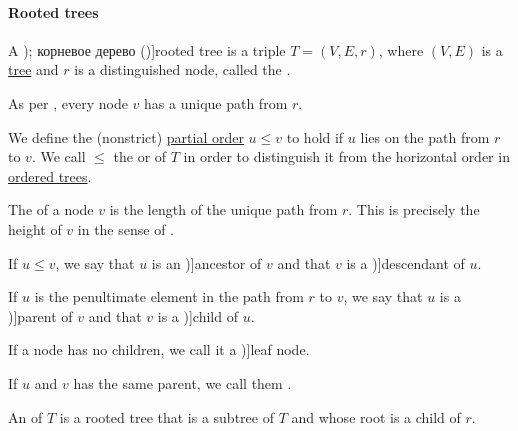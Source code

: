 \paragraph{Rooted trees}

\begin{definition}\label{def:rooted_tree}
  A \term[ru=ориентированное дерево (\cite[323]{Емеличев1990}); корневое дерево (\cite[.1]{Новиков2013})]{rooted tree} is a triple \( T = (V, E, r) \), where \( (V, E) \) is a \hyperref[def:tree]{tree} and \( r \) is a distinguished node, called the .

  As per , every node \( v \) has a unique path from \( r \).

  \begin{thmenum}
     We define the (nonstrict) \hyperref[def:partially_ordered_set]{partial order} \( u \leq v \) to hold if \( u \) lies on the path from \( r \) to \( v \). We call \( \leq \) the  or  of \( T \) in order to distinguish it from the horizontal order in \hyperref[def:ordered_tree]{ordered trees}.

     The  of a node \( v \) is the length of the unique path from \( r \). This is precisely the height of \( v \) in the sense of .

     If \( u \leq v \), we say that \( u \) is an \term[ru=предок (\cite[298]{БелоусовТкачёв2004})]{ancestor} of \( v \) and that \( v \) is a \term[ru=потомок (\cite[298]{БелоусовТкачёв2004})]{descendant} of \( u \).

     If \( u \) is the penultimate element in the path from \( r \) to \( v \), we say that \( u \) is a \term[ru=отец (\cite[298]{БелоусовТкачёв2004})]{parent} of \( v \) and that \( v \) is a \term[ru=сын (\cite[298]{БелоусовТкачёв2004})]{child} of \( u \).

     If a node has no children, we call it a \term[ru=лист (\cite[298]{БелоусовТкачёв2004})]{leaf node}.

     If \( u \) and \( v \) has the same parent, we call them .

    \mimprovised An  of \( T \) is a rooted tree that is a subtree of \( T \) and whose root is a child of \( r \).
  \end{thmenum}


\end{definition}

